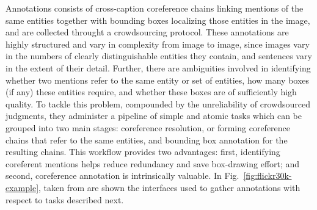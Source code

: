 Annotations consists of cross-caption coreference chains linking
mentions of the same entities together with bounding boxes localizing
those entities in the image, and are collected throught a
crowdsourcing protocol. These annotations are highly structured and
vary in complexity from image to image, since images vary in the
numbers of clearly distinguishable entities they contain, and
sentences vary in the extent of their detail. Further, there are
ambiguities involved in identifying whether two mentions refer to the
same entity or set of entities, how many boxes (if any) these entities
require, and whether these boxes are of sufficiently high quality. To
tackle this problem, compounded by the unreliability of crowdsourced
judgments, they administer a pipeline of simple and atomic tasks which
can be grouped into two main stages: coreference resolution, or
forming coreference chains that refer to the same entities, and
bounding box annotation for the resulting chains. This workflow
provides two advantages: first, identifying coreferent mentions helps
reduce redundancy and save box-drawing effort; and second, coreference
annotation is intrinsically valuable. In
Fig.~\ref{fig:flickr30k-example}, taken from  are shown the interfaces used to gather annotations with
respect to tasks described next.

